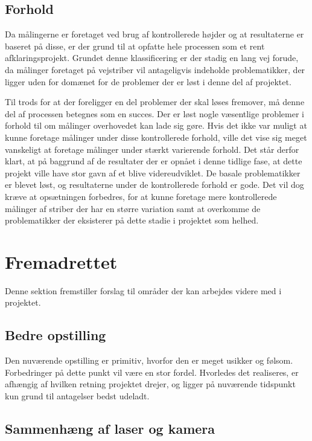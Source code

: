 \subsection{Forhold}
Da målingerne er foretaget ved brug af kontrollerede højder og at resultaterne er baseret på disse, er der grund til at opfatte hele processen som et rent afklaringsprojekt.
Grundet denne klassificering er der stadig en lang vej forude, da målinger foretaget på vejstriber vil antageligvis indeholde problematikker, der ligger uden for domænet for de problemer der er løst i denne del af projektet. 

Til trods for at der foreligger en del problemer der skal løses fremover, må denne del af processen betegnes som en succes.
Der er løst nogle væsentlige problemer i forhold til om målinger overhovedet kan lade sig gøre. Hvis det ikke var muligt at kunne foretage målinger under disse kontrollerede forhold, ville det vise sig meget vanskeligt at foretage målinger under stærkt varierende forhold.
Det står derfor klart, at på baggrund af de resultater der er opnået i denne tidlige fase, at dette projekt ville have stor gavn af et blive videreudviklet. De basale problematikker er blevet løst, og resultaterne under de kontrollerede forhold er gode. Det vil dog kræve at opsætningen forbedres, for at kunne foretage mere kontrollerede målinger af striber der har en større variation samt at overkomme de problematikker der eksisterer på dette stadie i projektet som helhed.

\newpage

\section{Fremadrettet}

Denne sektion fremstiller forslag til områder der kan arbejdes videre med i projektet.

\subsection{Bedre opstilling}

Den nuværende opstilling er primitiv, hvorfor den er meget usikker og følsom. Forbedringer på dette punkt vil være en stor fordel. Hvorledes det realiseres, er afhængig af hvilken retning projektet drejer, og ligger på nuværende tidspunkt kun grund til antagelser bedst udeladt.

\subsection{Sammenhæng af laser og kamera}

